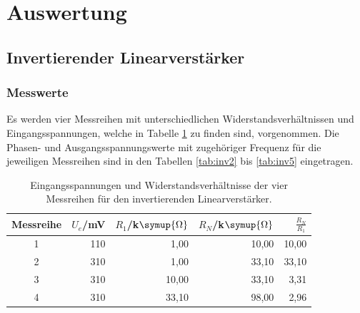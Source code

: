 \section{Auswertung}
\label{sec:Auswertung}

        \subsection{Invertierender Linearverstärker}

            \subsubsection{Messwerte}

                Es werden vier Messreihen mit unterschiedlichen Widerstandsverhältnissen und 
                Eingangsspannungen, welche in Tabelle \ref{tab:inv1} zu finden sind, vorgenommen.
                Die Phasen- und Ausgangsspannungswerte mit zugehöriger Frequenz für die jeweiligen 
                Messreihen sind in den Tabellen \ref{tab:inv2} bis \ref{tab:inv5} eingetragen.

                \begin{table}
                    \centering
                    \caption{Eingangsspannungen und Widerstandsverhältnisse der vier Messreihen
                    für den invertierenden Linearverstärker.}
                    \label{tab:inv1}
                    \begin{tabular}{c r r r r}
                        \toprule
                            Messreihe & $U_e$/mV & $R_1$/k$\symup{\Omega}$ & $R_N$/k$\symup{\Omega}$ & $\frac{R_N}{R_1}$\\
                        \midrule
                           1 & 110 & 1,00 & 10,00 & 10,00\\
                           2 & 310 & 1,00 & 33,10 & 33,10\\
                           3 & 310 & 10,00 & 33,10 & 3,31\\
                           4 & 310 & 33,10 & 98,00 & 2,96\\
                        \bottomrule
                    \end{tabular}
                \end{table}

